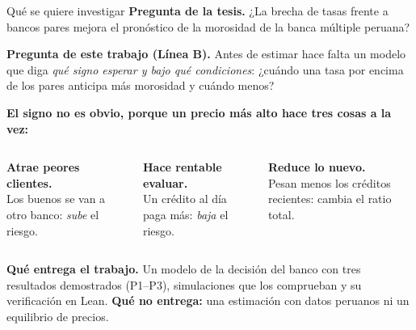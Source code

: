 \documentclass[aspectratio=169,10pt,t]{beamer}
\begin{document}
\begin{frame}{Qué se quiere investigar}
\vspace{1mm}
\textbf{Pregunta de la tesis.} ¿La brecha de tasas frente a bancos pares mejora el
pronóstico de la morosidad de la banca múltiple peruana?

\vspace{1mm}
\textbf{Pregunta de este trabajo (Línea B).} Antes de estimar hace falta un modelo
que diga \emph{qué signo esperar y bajo qué condiciones}: ¿cuándo una tasa por encima
de los pares anticipa más morosidad y cuándo menos?
\vspace{1mm}

{\small\textbf{El signo no es obvio, porque un precio más alto hace tres cosas a la vez:}\par}
\vspace{-.5mm}
\begin{columns}[T,onlytextwidth]
\begin{plainbox}\small
\textbf{Atrae peores clientes.}\\ Los buenos se van a otro banco: \emph{sube} el riesgo.
\end{plainbox}
\begin{plainbox}\small
\textbf{Hace rentable evaluar.}\\ Un crédito al día paga más: \emph{baja} el riesgo.
\end{plainbox}
\begin{plainbox}\small
\textbf{Reduce lo nuevo.}\\ Pesan menos los créditos recientes: cambia el ratio total.
\end{plainbox}
\end{columns}
\begin{keybox}\small
\textbf{Qué entrega el trabajo.} Un modelo de la decisión del banco con tres
resultados demostrados (P1--P3), simulaciones que los comprueban y su verificación
en Lean. \textbf{Qué no entrega:} una estimación con datos peruanos ni un equilibrio
de precios.
\end{keybox}
\end{frame}
\end{document}
